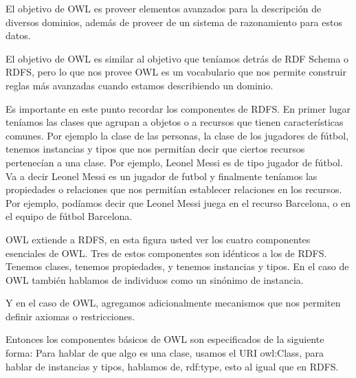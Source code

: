 El objetivo de OWL es proveer elementos avanzados para la descripción de diversos dominios, además de proveer de un sistema de razonamiento para estos datos.

El objetivo de OWL es similar al objetivo que teníamos detrás de RDF Schema o RDFS, pero lo que nos provee OWL es un vocabulario que nos permite construir reglas más avanzadas cuando estamos describiendo un dominio.

Es importante en este punto recordar los componentes de RDFS. En primer lugar teníamos las clases que agrupan a objetos o a recursos que tienen características comunes. Por ejemplo la clase de las personas, la clase de los jugadores de fútbol, tenemos instancias y tipos que nos permitían decir que ciertos recursos pertenecían a una clase. Por ejemplo, Leonel Messi es de tipo jugador de fútbol. Va a decir Leonel Messi es un jugador de futbol y finalmente teníamos las propiedades o relaciones que nos permitían establecer relaciones en los recursos. Por ejemplo, podíamos decir que Leonel Messi juega en el recurso Barcelona, o en el equipo de fútbol Barcelona.

OWL extiende a RDFS, en esta figura usted ver los cuatro componentes esenciales de OWL. Tres de estos componentes son idénticos a los de RDFS. Tenemos clases, tenemos propiedades, y tenemos instancias y tipos. En el caso de OWL también hablamos de individuos como un sinónimo de instancia.

Y en el caso de OWL, agregamos adicionalmente mecanismos que nos permiten definir axiomas o restricciones.

Entonces los componentes básicos de OWL son especificados de la siguiente forma: Para hablar de que algo es una clase, usamos el URI owl:Class, para hablar de instancias y tipos, hablamos de, rdf:type, esto al igual que en RDFS.

